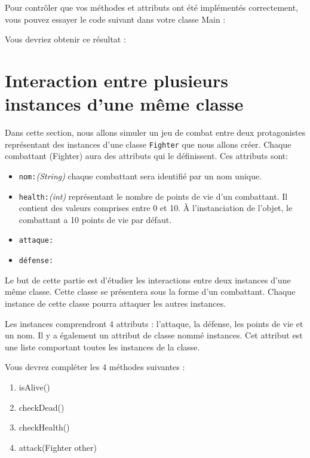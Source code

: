 Pour contrôler que vos méthodes et attributs ont été implémentés correctement, vous pouvez essayer le code suivant dans votre classe Main :

	
	
Vous devriez obtenir ce résultat :

    

\section{Interaction entre plusieurs instances d'une même classe}
Dans cette section, nous allons simuler un jeu de combat entre deux protagonistes représentant des instances d'une classe \lstinline{Fighter} que nous allons créer.
Chaque combattant (Fighter) aura des attributs qui le définissent. Ces attributs sont:
\begin{itemize}
    \item \lstinline{nom:}\textit{(String)} chaque combattant sera identifié par un nom unique.
    \item \lstinline{health:}\textit{(int)} représentant le nombre de points de vie d'un combattant. Il contient des valeurs comprises entre 0 et 10. À l'instanciation de l'objet, le combattant a 10 points de vie par défaut.
    \item \lstinline{attaque:} %
    \item \lstinline{défense:}
\end{itemize}

Le but de cette partie est d'étudier les interactions entre deux instances d'une même classe. Cette classe se présentera sous la forme d'un combattant. Chaque instance de cette classe pourra attaquer les autres instances.

Les instances comprendront 4 attributs : l'attaque, la défense, les points de vie et un nom. Il y a également un attribut de classe nommé instances. Cet attribut est une liste comportant toutes les instances de la classe.

Vous devrez compléter les 4 méthodes suivantes :
\begin{enumerate}
\item isAlive()
\item checkDead()
\item checkHealth()
\item attack(Fighter other)
\end{enumerate}


